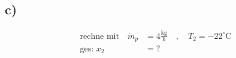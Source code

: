 

\subsection*{c)}
\begin{align*}
\text{rechne mit} \quad \dot{m}_p &= 4 \frac{\text{kg}}{\text{h}} \quad , \quad T_2 = -22^\circ \text{C} \\
\text{ges: } x_2 &= ?
\end{align*}